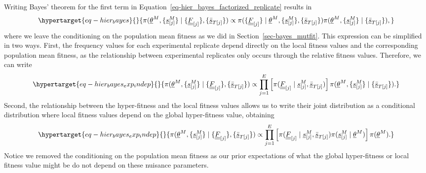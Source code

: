 \documentclass[
]{scrartcl}
\begin{document}
\begin{refsegment}
Writing Bayes' theorem for the first term in
Equation~\ref{eq-hier_bayes_factorized_replicate} results in
\begin{equation}\protect\hypertarget{eq-hier_bayes}{}{
\pi(
    \underline{\theta}^M, 
    \{\underline{s}^M_{[j]}\} \mid
    \{\underline{\underline{F}}_{[j]}\},
    \{\underline{\bar{s}}_{T[j]}\}
) \propto
\pi(
    \{\underline{\underline{F}}_{[j]}\} \mid
    \underline{\theta}^M, 
    \{\underline{s}^M_{[j]}\},
    \{\underline{\bar{s}}_{T[j]}\}
)
\pi(
    \underline{\theta}^M, 
    \{\underline{s}^M_{[j]}\} \mid
    \{\underline{\bar{s}}_{T[j]}\}
),
}\label{eq-hier_bayes}\end{equation} where we leave the conditioning on
the population mean fitness as we did in Section~\ref{sec-bayes_mutfit}.
This expression can be simplified in two ways. First, the frequency
values for each experimental replicate depend directly on the local
fitness values and the corresponding population mean fitness, as the
relationship between experimental replicates only occurs through the
relative fitness values. Therefore, we can write
\begin{equation}\protect\hypertarget{eq-hier_bayes_exp_indep}{}{
\pi(
    \underline{\theta}^M, 
    \{\underline{s}^M_{[j]}\} \mid
    \{\underline{\underline{F}}_{[j]}\},
    \{\underline{\bar{s}}_{T[j]}\}
) \propto
\prod_{j=1}^E\left[
    \pi(
        \underline{\underline{F}}_{[j]} \mid
        \underline{s}^M_{[j]},
        \underline{\bar{s}}_{T[j]}
    )
\right]
\pi(
    \underline{\theta}^M, 
    \{\underline{s}^M_{[j]}\} \mid
    \{\underline{\bar{s}}_{T[j]}\}
).
}\label{eq-hier_bayes_exp_indep}\end{equation} Second, the relationship
between the hyper-fitness and the local fitness values allows us to
write their joint distribution as a conditional distribution where local
fitness values depend on the global hyper-fitness value, obtaining
\begin{equation}\protect\hypertarget{eq-hier_bayes_exp_indep}{}{
\pi(
    \underline{\theta}^M, 
    \{\underline{s}^M_{[j]}\} \mid
    \{\underline{\underline{F}}_{[j]}\},
    \{\underline{\bar{s}}_{T[j]}\}
) \propto
\prod_{j=1}^E\left[
    \pi(
        \underline{\underline{F}}_{[j]} \mid
        \underline{s}^M_{[j]},
        \underline{\bar{s}}_{T[j]}
    )
    \pi(
        \underline{s}^M_{[j]} \mid
        \underline{\theta}^M
    )
\right] 
\pi(
    \underline{\theta}^M
).
}\label{eq-hier_bayes_exp_indep}\end{equation} Notice we removed the
conditioning on the population mean fitness as our prior expectations of
what the global hyper-fitness or local fitness value might be do not
depend on these nuisance parameters.


\end{refsegment}
\end{document}

